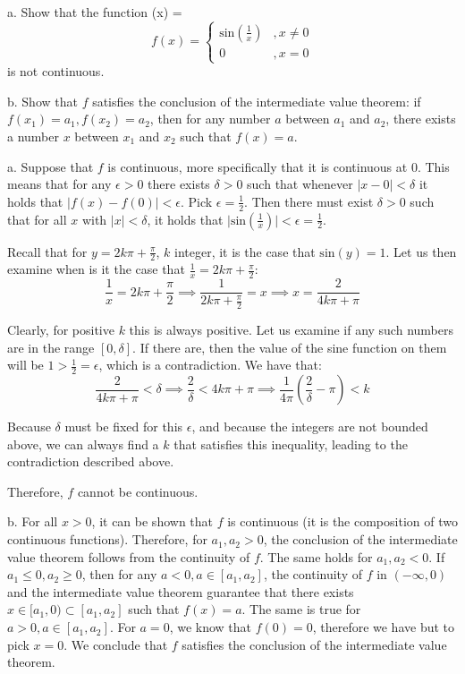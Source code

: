 \begin{exercise}{2}
    a. Show that the function
    (x) = \[f(x) =  \begin{cases} 
      \text{sin}(\frac{1}{x}) &, x \neq 0 \\
      0 &, x =0
   \end{cases}
\]
is not continuous.

b. Show that $f$ satisfies the conclusion of the intermediate value theorem: if $f(x_1) = a_1, f(x_2) = a_2$, then for any number $a$ between $a_1$ and $a_2$, there exists a number $x$ between $x_1$ and $x_2$ such that $f(x) = a$.
\end{exercise}

\begin{solution}

    a. Suppose that $f$ is continuous, more specifically that it is continuous at 0. This means that for any $\epsilon > 0$ there exists $\delta > 0$ such that whenever $\lvert x - 0\rvert < \delta$ it holds that $\lvert f(x) - f(0) \rvert < \epsilon$. Pick $\epsilon = \frac{1}{2}$. Then there must exist $\delta > 0$ such that for all $x$ with $\lvert x \rvert < \delta$, it holds that $\lvert \text{sin}(\frac{1}{x}) \rvert < \epsilon = \frac{1}{2}$.

    Recall that for $y = 2k\pi + \frac{\pi}{2}$, $k$ integer, it is the case that $\text{sin}(y) = 1$. Let us then examine when is it the case that $\frac{1}{x} = 2k\pi + \frac{\pi}{2}$:
    $$\frac{1}{x} = 2k\pi + \frac{\pi}{2} \implies \frac{1}{2k\pi + \frac{\pi}{2}} = x \implies x = \frac{2}{4k\pi + \pi}$$

    Clearly, for positive $k$ this is always positive. Let us examine if any such numbers are in the range $[0, \delta]$. If there are, then the value of the sine function on them will be $1 > \frac{1}{2} = \epsilon$, which is a contradiction. We have that:
    $$\frac{2}{4k\pi + \pi} < \delta \implies \frac{2}{\delta} < 4k\pi + \pi \implies \frac{1}{4\pi}(\frac{2}{\delta} - \pi) < k$$

    Because $\delta$ must be fixed for this $\epsilon$, and because the integers are not bounded above, we can always find a $k$ that satisfies this inequality, leading to the contradiction described above.

    Therefore, $f$ cannot be continuous.

    b. For all $x > 0$, it can be shown that $f$ is continuous (it is the composition of two continuous functions). Therefore, for $a_1, a_2 > 0$, the conclusion of the intermediate value theorem follows from the continuity of $f$. The same holds for $a_1, a_2 < 0$. If $a_1 \leq 0, a_2 \geq 0$, then for any $a < 0, a \in [a_1, a_2]$, the continuity of $f$ in $(-\infty, 0)$ and the intermediate value theorem guarantee that there exists $x \in [a_1, 0) \subset [a_1, a_2]$ such that $f(x) = a$. The same is true for $a > 0, a \in [a_1, a_2]$. For $a = 0$, we know that $f(0) = 0$, therefore we have but to pick $x = 0$. We conclude that $f$ satisfies the conclusion of the intermediate value theorem.
    
\end{solution}

